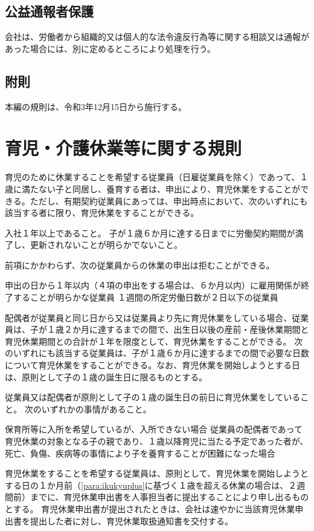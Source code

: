 \documentclass[10pt,a4paper,uplatex]{jsarticle}
\begin{document}
\subsection{公益通報者保護}

会社は、労働者から組織的又は個人的な法令違反行為等に関する相談又は通報があった場合には、別に定めるところにより処理を行う。

\subsection*{附則}
本編の規則は、令和3年12月15日から施行する。



\clearpage
\section{育児・介護休業等に関する規則}

育児のために休業することを希望する従業員（日雇従業員を除く）であって、１歳に満たない子と同居し、養育する者は、申出により、育児休業をすることができる。ただし、有期契約従業員にあっては、申出時点において、次のいずれにも該当する者に限り、育児休業をすることができる。
\label{para:ChildcareLayoff}
\begin{enumerate}
    \itm 入社１年以上であること。
    \itm 子が１歳６か月に達する日までに労働契約期間が満了し、更新されないことが明らかでないこと。
\end{enumerate}
\term 前項にかかわらず、次の従業員からの休業の申出は拒むことができる。
\begin{enumerate}
    \itm 申出の日から１年以内（４項の申出をする場合は、６か月以内）に雇用関係が終了することが明らかな従業員
    \itm １週間の所定労働日数が２日以下の従業員
\end{enumerate}
\term 配偶者が従業員と同じ日から又は従業員より先に育児休業をしている場合、従業員は、子が１歳２か月に達するまでの間で、出生日以後の産前・産後休業期間と育児休業期間との合計が１年を限度として、育児休業をすることができる。
\label{para:ikukyuplus}
\term 次のいずれにも該当する従業員は、子が１歳６か月に達するまでの間で必要な日数について育児休業をすることができる。なお、育児休業を開始しようとする日は、原則として子の１歳の誕生日に限るものとする。
\begin{enumerate}
    \itm 従業員又は配偶者が原則として子の１歳の誕生日の前日に育児休業をしていること。
    \itm 次のいずれかの事情があること。
    \begin{enumerate}
        \itm 保育所等に入所を希望しているが、入所できない場合
        \itm 従業員の配偶者であって育児休業の対象となる子の親であり、１歳以降育児に当たる予定であった者が、死亡、負傷、疾病等の事情により子を養育することが困難になった場合
    \end{enumerate}
\end{enumerate}
\term 育児休業をすることを希望する従業員は、原則として、育児休業を開始しようとする日の１か月前（\ref{para:ikukyuplus}に基づく１歳を超える休業の場合は、２週間前）までに、育児休業申出書を人事担当者に提出することにより申し出るものとする。
\term 育児休業申出書が提出されたときは、会社は速やかに当該育児休業申出書を提出した者に対し、育児休業取扱通知書を交付する。
\end{document}
